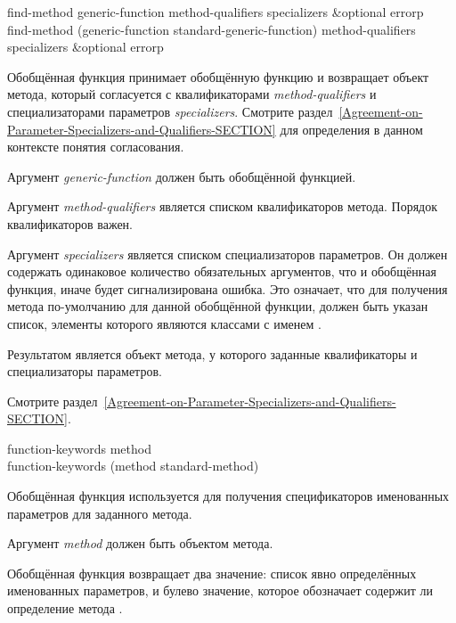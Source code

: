 \begin{defun}
find-method generic-function method-qualifiers specializers &optional errorp \\
find-method (generic-function standard-generic-function)
   method-qualifiers specializers &optional errorp

Обобщённая функция  принимает обобщённую функцию и возвращает
объект метода, который согласуется с квалификаторами \emph{method-qualifiers} и
специализаторами параметров \emph{specializers}.
Смотрите раздел~\ref{Agreement-on-Parameter-Specializers-and-Qualifiers-SECTION}
для определения в данном контексте понятия согласования.

Аргумент \emph{generic-function} должен быть обобщённой функцией.

Аргумент \emph{method-qualifiers} является списком квалификаторов
метода. Порядок квалификаторов важен.

Аргумент \emph{specializers} является списком специализаторов параметров. Он
должен содержать одинаковое количество обязательных аргументов, что и обобщённая
функция, иначе будет сигнализирована ошибка. Это означает, что для получения
метода по-умолчанию для данной обобщённой функции, должен быть указан список,
элементы которого являются классами с именем .

Результатом  является объект метода, у которого заданные
квалификаторы и специализаторы параметров.

Смотрите раздел~\ref{Agreement-on-Parameter-Specializers-and-Qualifiers-SECTION}.
\end{defun}


\begin{defun}
function-keywords method \\
function-keywords (method standard-method)

Обобщённая функция  используется для получения
спецификаторов именованных параметров для заданного метода.

Аргумент \emph{method} должен быть объектом метода.

Обобщённая функция возвращает два значение:
список явно определённых именованных параметров, и булево значение, которое
обозначает содержит ли определение метода .
\end{defun}

